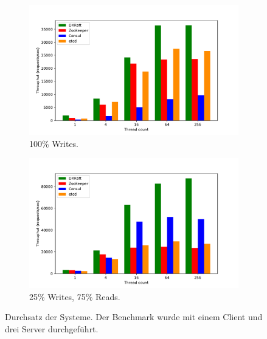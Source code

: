 \begin{figure}[p]
	\centering
	\begin{subfigure}[t]{0.8\textwidth}
		\includegraphics[width=\textwidth]{img/throughput.pdf}
		\caption{100\% Writes.}
	\end{subfigure} 
	\begin{subfigure}[t]{0.8\textwidth}
		\includegraphics[width=\textwidth]{img/throughput2.pdf}
		\caption{25\% Writes, 75\% Reads.}
	\end{subfigure}
	\caption{Durchsatz der Systeme. Der Benchmark wurde mit einem Client und drei Server durchgeführt.}
	\label{fig:throughput}
\end{figure}

